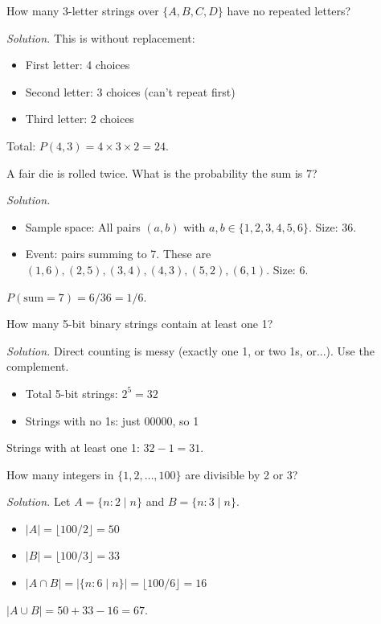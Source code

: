 \begin{example}
How many 3-letter strings over $\{A, B, C, D\}$ have no repeated letters?

\emph{Solution.} This is without replacement:
\begin{itemize}
  \item First letter: 4 choices
  \item Second letter: 3 choices (can't repeat first)
  \item Third letter: 2 choices
\end{itemize}
Total: $P(4, 3) = 4 \times 3 \times 2 = 24$.
\end{example}

\begin{example}
A fair die is rolled twice. What is the probability the sum is 7?

\emph{Solution.}
\begin{itemize}
  \item Sample space: All pairs $(a, b)$ with $a, b \in \{1, 2, 3, 4, 5, 6\}$. Size: $36$.
  \item Event: pairs summing to 7. These are $(1,6), (2,5), (3,4), (4,3), (5,2), (6,1)$. Size: 6.
\end{itemize}
$P(\text{sum} = 7) = 6/36 = 1/6$.
\end{example}

\begin{example}
How many 5-bit binary strings contain at least one 1?

\emph{Solution.} Direct counting is messy (exactly one 1, or two 1s, or...). Use the complement.
\begin{itemize}
  \item Total 5-bit strings: $2^5 = 32$
  \item Strings with no 1s: just $00000$, so 1
\end{itemize}
Strings with at least one 1: $32 - 1 = 31$.
\end{example}

\begin{example}
How many integers in $\{1, 2, \ldots, 100\}$ are divisible by 2 or 3?

\emph{Solution.} Let $A = \{n : 2 \mid n\}$ and $B = \{n : 3 \mid n\}$.
\begin{itemize}
  \item $|A| = \lfloor 100/2 \rfloor = 50$
  \item $|B| = \lfloor 100/3 \rfloor = 33$
  \item $|A \cap B| = |\{n : 6 \mid n\}| = \lfloor 100/6 \rfloor = 16$
\end{itemize}
$|A \cup B| = 50 + 33 - 16 = 67$.
\end{example}

